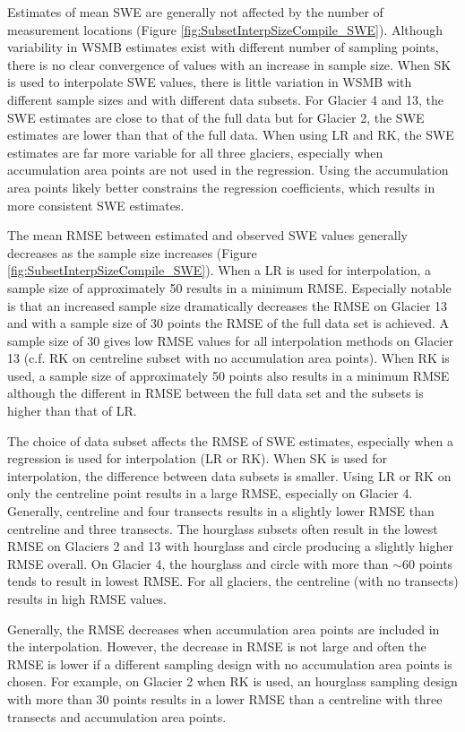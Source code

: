 \documentclass[12pt]{article}
\begin{document}
Estimates of mean SWE are generally not affected by the number of measurement locations (Figure \ref{fig:SubsetInterpSizeCompile_SWE}). Although variability in WSMB estimates exist with different number of sampling points, there is no clear convergence of values with an increase in sample size. When SK is used to interpolate SWE values, there is little variation in WSMB with different sample sizes and with different data subsets. For Glacier 4 and 13, the SWE estimates are close to that of the full data but for Glacier 2, the SWE estimates are lower than that of the full data. When using LR and RK, the SWE estimates are far more variable for all three glaciers, especially when accumulation area points are not used in the regression. Using the accumulation area points likely better constrains the regression coefficients, which results in more consistent SWE estimates. 

The mean RMSE between estimated and observed SWE values generally decreases as the sample size increases (Figure \ref{fig:SubsetInterpSizeCompile_SWE}). When a LR is used for interpolation, a sample size of approximately 50 results in a minimum RMSE. Especially notable is that an increased sample size dramatically decreases the RMSE on Glacier 13 and with a sample size of 30 points the RMSE of the full data set is achieved. A sample size of 30 gives low RMSE values for all interpolation methods on Glacier 13 (c.f. RK on centreline subset with no accumulation area points).  When RK is used, a sample size of approximately 50 points also results in a minimum RMSE although the different in RMSE between the full data set and the subsets is higher than that of LR. 

The choice of data subset affects the RMSE of SWE estimates, especially when a regression is used for interpolation (LR or RK). When SK is used for interpolation, the difference between data subsets is smaller. Using LR or RK on only the centreline point results in a large RMSE, especially on Glacier 4. Generally, centreline and four transects results in a slightly lower RMSE than centreline and three transects. The hourglass subsets often result in the lowest RMSE on Glaciers 2 and 13 with hourglass and circle producing a slightly higher RMSE overall. On Glacier 4, the hourglass and circle with more than $\sim$60 points tends to result in lowest RMSE. For all glaciers, the centreline (with no transects) results in high RMSE values.

Generally, the RMSE decreases when accumulation area points are included in the interpolation. However, the decrease in RMSE is not large and often the RMSE is lower if a different sampling design with no accumulation area points is chosen. For example, on Glacier 2 when RK is used, an hourglass sampling design with more than 30 points results in a lower RMSE than a centreline with three transects and accumulation area points. 
\end{document}
